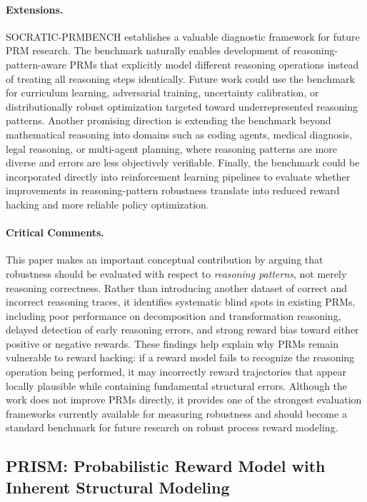 \documentclass[11pt]{article}
\begin{document}
\paragraph{Extensions.}
SOCRATIC-PRMBENCH establishes a valuable diagnostic framework for future PRM research. The benchmark naturally enables development of reasoning-pattern-aware PRMs that explicitly model different reasoning operations instead of treating all reasoning steps identically. Future work could use the benchmark for curriculum learning, adversarial training, uncertainty calibration, or distributionally robust optimization targeted toward underrepresented reasoning patterns. Another promising direction is extending the benchmark beyond mathematical reasoning into domains such as coding agents, medical diagnosis, legal reasoning, or multi-agent planning, where reasoning patterns are more diverse and errors are less objectively verifiable. Finally, the benchmark could be incorporated directly into reinforcement learning pipelines to evaluate whether improvements in reasoning-pattern robustness translate into reduced reward hacking and more reliable policy optimization.

\paragraph{Critical Comments.}
This paper makes an important conceptual contribution by arguing that robustness should be evaluated with respect to \emph{reasoning patterns}, not merely reasoning correctness. Rather than introducing another dataset of correct and incorrect reasoning traces, it identifies systematic blind spots in existing PRMs, including poor performance on decomposition and transformation reasoning, delayed detection of early reasoning errors, and strong reward bias toward either positive or negative rewards. These findings help explain why PRMs remain vulnerable to reward hacking: if a reward model fails to recognize the reasoning operation being performed, it may incorrectly reward trajectories that appear locally plausible while containing fundamental structural errors. Although the work does not improve PRMs directly, it provides one of the strongest evaluation frameworks currently available for measuring robustness and should become a standard benchmark for future research on robust process reward modeling.

\subsection{PRISM: Probabilistic Reward Model with Inherent Structural Modeling}
\end{document}
